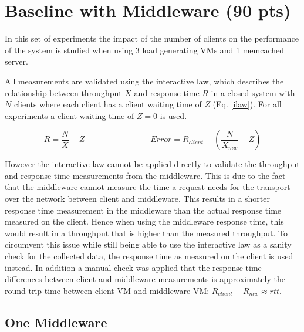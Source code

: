 \documentclass[report.tex]{subfiles}
\begin{document}
\section{Baseline with Middleware (90 pts)}\label{exp3}


In this set of experiments the impact of the number of clients on the  performance of the system is studied when using 3 load generating VMs and 1 memcached server. 

All measurements are validated using the interactive law, which describes the relationship between throughput $X$ and response time $R$ in a closed system with $N$ clients where each client has a client waiting time of $Z$ (Eq. \ref{ilaw}). For all experiments a client waiting time of $Z = 0$ is used.

\begin{equation}\label{ilaw}
R = \frac{N}{X} - Z
\qquad\qquad\qquad\qquad
Error = R_{client} - (\frac{N}{X_{mw}}  - Z)
\end{equation}

However the interactive law cannot be applied directly to validate the throughput and response time measurements from the middleware.
This is due to the fact that the middleware cannot measure the time a request needs for the transport over the network between client and middleware. This results in a shorter response time measurement in the middleware than the actual response time measured on the client.
Hence when using the middleware response time, this would result in a throughput that is higher than the measured throughput.
To circumvent this issue while still being able to use the interactive law as a sanity check for the collected data, the response time as measured on the client is used instead. In addition a manual check was applied that the response time differences between client and middleware measurements is approximately the round trip time between client VM and middleware VM: $R_{client} - R_{mw} \approx rtt$.


\subsection{One Middleware}\label{exp31}
\end{document}

